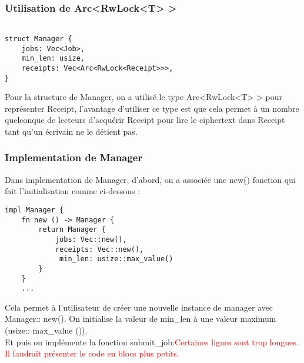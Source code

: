 \documentclass{article}
\newcommand{\TODO}[1]{\textcolor{red}{#1}}
\begin{document}

\subsubsection{Utilisation de Arc<RwLock<T> > }
\begin{lstlisting}

struct Manager {
    jobs: Vec<Job>,
    min_len: usize,
    receipts: Vec<Arc<RwLock<Receipt>>>,
}
\end{lstlisting}
Pour la structure de Manager, on a utilisé le type Arc<RwLock<T> > pour représenter Receipt, l'avantage d'utiliser ce type est que cela permet à un nombre quelconque de lecteurs d’acquérir Receipt pour lire le ciphertext dans Receipt tant qu’un écrivain ne le détient pas.\\
\subsubsection{Implementation de Manager}
Dans implementation de Manager, d'abord, on a associée une new() fonction qui fait l'initialisation comme ci-dessous : 
\begin{lstlisting}
impl Manager {
    fn new () -> Manager {
        return Manager {
            jobs: Vec::new(),
            receipts: Vec::new(),
             min_len: usize::max_value()
        }
    }
    ...
\end{lstlisting}
Cela permet à l'utilisateur de créer une nouvelle instance de manager avec Manager:: new().
On initialise la valeur de min\_len à une valeur maximum (usize:: max\_value ()).\\

Et puis on implémente la fonction submit\_job:\TODO{Certaines lignes sont trop longues. Il faudrait présenter le code en blocs plus petits.}
\end{document}

